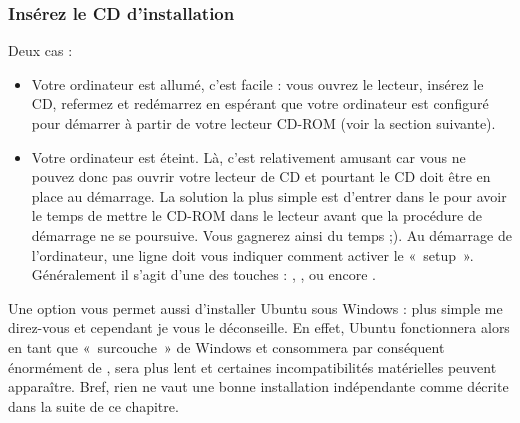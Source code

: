 \subsubsection{Insérez le CD d'installation}
Deux cas :
\begin{itemize}
\item Votre ordinateur est allumé, c'est facile : vous ouvrez le lecteur, insérez le CD, refermez et redémarrez en espérant que votre ordinateur est configuré pour démarrer à partir de votre lecteur CD-ROM (voir la section suivante).
\item Votre ordinateur est éteint. Là, c'est relativement amusant car vous ne pouvez donc pas ouvrir votre lecteur de CD et pourtant le CD doit être en place au démarrage. La solution la plus simple est d'entrer dans le  pour avoir le temps de mettre le CD-ROM dans le lecteur avant que la procédure de démarrage ne se poursuive. Vous gagnerez ainsi du temps ;). Au démarrage de l'ordinateur, une ligne doit vous indiquer comment activer le «~setup~». Généralement il s'agit d'une des touches : , ,  ou encore .
\end{itemize}
\begin{nota}
Une option vous permet aussi d'installer Ubuntu sous Windows : plus simple me direz-vous et cependant je vous le déconseille. En effet, Ubuntu fonctionnera alors en tant que  «~surcouche~» de Windows et consommera par conséquent énormément de , sera plus lent et certaines incompatibilités matérielles peuvent apparaître. Bref, rien ne vaut une bonne installation indépendante comme décrite dans la suite de ce chapitre.
\end{nota}
